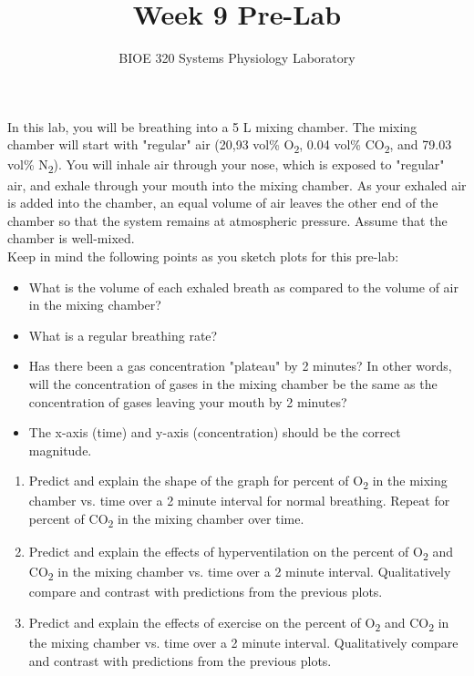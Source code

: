 \documentclass{article}
\title{Week 9 Pre-Lab}
\author{BIOE 320 Systems Physiology Laboratory}
\date{}
\begin{document}
\maketitle
\large

In this lab, you will be breathing into a 5 L mixing chamber. The mixing chamber will start with "regular" air (20,93 vol\% O\textsubscript{2}, 0.04 vol\% CO\textsubscript{2}, and 79.03 vol\% N\textsubscript{2}). You will inhale air through your nose, which is exposed to "regular" air, and exhale through your mouth into the mixing chamber. As your exhaled air is added into the chamber, an equal volume of air leaves the other end of the chamber so that the system remains at atmospheric pressure. Assume that the chamber is well-mixed.\\

Keep in mind the following points as you sketch plots for this pre-lab:\begin{itemize}
	\item What is the volume  of each exhaled breath as compared to the volume of air in the mixing chamber?
	\item What is a regular breathing rate?
	\item Has there been a gas concentration "plateau" by 2 minutes? In other words, will the concentration of gases in the mixing chamber be the same as the concentration of gases leaving your mouth by 2 minutes?
	\item The x-axis (time) and y-axis (concentration) should be the correct magnitude.
\end{itemize}

\begin{enumerate}
	\item Predict and explain the shape of the graph for percent of O\textsubscript{2} in the mixing chamber vs. time over a 2 minute interval for normal breathing. Repeat for percent of CO\textsubscript{2} in the mixing chamber over time.
	\item Predict and explain the effects of hyperventilation on the percent of O\textsubscript{2} and CO\textsubscript{2} in the mixing chamber vs. time over a 2 minute interval. Qualitatively compare and contrast with predictions from the previous plots.
	\item Predict and explain the effects of exercise on the percent of O\textsubscript{2} and CO\textsubscript{2} in the mixing chamber vs. time over a 2 minute interval. Qualitatively compare and contrast with predictions from the previous plots.
\end{enumerate}
\end{document}
